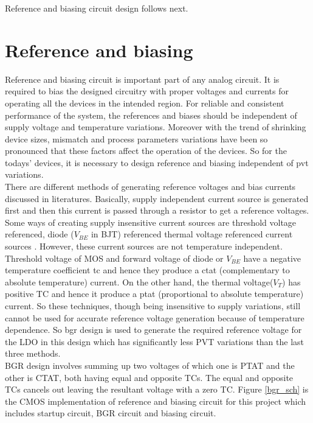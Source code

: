 \documentclass[12pt,a4paper,UKenglish]{article}
\begin{document}
Reference and biasing circuit design follows next. \\

\newpage

\section{Reference and biasing}

Reference and biasing circuit is important part of any analog circuit. It is required to bias the designed circuitry with proper voltages and currents for operating all the devices in the intended region. For reliable and consistent  performance of the system, the references and biases should be independent of supply voltage and temperature variations. Moreover with the trend of shrinking device sizes, mismatch and process parameters variations have been so pronounced that these factors affect the operation of the devices. So for the todays' devices, it is necessary to design reference and biasing independent of \acrshort{pvt} variations. \\

There are different methods of generating reference voltages and bias currents discussed in literatures. Basically, supply independent current source is generated first and then this current is passed through a resistor to get a reference voltages. Some ways of creating supply insensitive current sources are threshold voltage referenced, diode ($V_{BE}$ in BJT) referenced thermal voltage referenced current sources \cite[pp. 305-315]{gray_2009}. However, these current sources are not temperature independent. Threshold voltage of MOS and forward voltage of diode or $V_{BE}$ have a negative temperature coefficient \acrshort{tc}  and hence they produce a \acrshort{ctat} (complementary to absolute temperature) current. On the other hand, the thermal voltage($V_T$) has positive TC and hence it produce a \acrshort{ptat} (proportional to absolute temperature) current. So these techniques, though being insensitive to supply variations, still cannot be used for accurate reference voltage generation because of temperature dependence. So \gls{bgr} design is used to generate the required reference voltage for the LDO in this design which has significantly less PVT variations than the last three methods.\\

BGR design involves summing up two voltages of which one is PTAT and the other is CTAT, both having equal and opposite TCs. The equal and opposite TCs cancels out leaving the resultant voltage with a zero TC. Figure  \ref{bgr_sch} is the CMOS implementation of reference and biasing circuit for this project which includes startup circuit, BGR circuit and biasing circuit. \\
\end{document}
